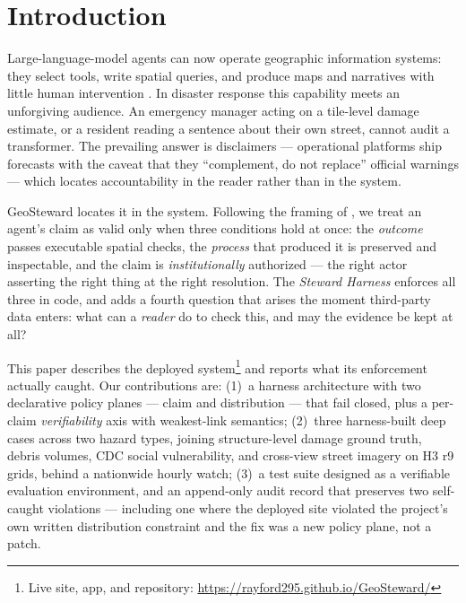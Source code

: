 \documentclass[sigconf,screen]{acmart}
\begin{document}

\maketitle

\section{Introduction}

Large-language-model agents can now operate geographic information
systems: they select tools, write spatial queries, and produce maps and
narratives with little human intervention
\cite{li2023autonomous,zhang2024geogpt}. In disaster response this
capability meets an unforgiving audience. An emergency manager acting on
a tile-level damage estimate, or a resident reading a sentence about
their own street, cannot audit a transformer. The prevailing answer is
disclaimers --- operational platforms ship forecasts with the caveat that
they ``complement, do not replace'' official warnings --- which locates
accountability in the reader rather than in the system.

GeoSteward locates it in the system. Following the framing of
\citet{yang2026accountable}, we treat an agent's claim as valid only
when three conditions hold at once: the \emph{outcome} passes executable
spatial checks, the \emph{process} that produced it is preserved and
inspectable, and the claim is \emph{institutionally} authorized --- the
right actor asserting the right thing at the right resolution. The
\emph{Steward Harness} enforces all three in code, and adds a fourth
question that arises the moment third-party data enters: what can a
\emph{reader} do to check this, and may the evidence be kept at all?

This paper describes the deployed system\footnote{Live site, app, and
repository: \url{https://rayford295.github.io/GeoSteward/}} and reports
what its enforcement actually caught. Our contributions are:
(1)~a harness architecture with two declarative policy planes --- claim
and distribution --- that fail closed, plus a per-claim
\emph{verifiability} axis with weakest-link semantics;
(2)~three harness-built deep cases across two hazard types, joining
structure-level damage ground truth, debris volumes, CDC social
vulnerability, and cross-view street imagery on H3 r9 grids, behind a
nationwide hourly watch;
(3)~a test suite designed as a verifiable evaluation environment, and an
append-only audit record that preserves two self-caught violations ---
including one where the deployed site violated the project's own written
distribution constraint and the fix was a new policy plane, not a patch.
\end{document}
